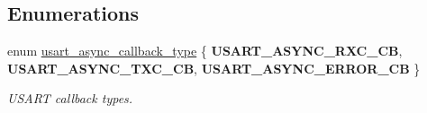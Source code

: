 \subsection*{Enumerations}
\begin{DoxyCompactItemize}
\item 
\mbox{\label{group__doc__driver__hal__usart__async_ga5a82ef383f62daa061a55838c8fc6d39}} 
enum \hyperlink{group__doc__driver__hal__usart__async_ga5a82ef383f62daa061a55838c8fc6d39}{usart\+\_\+async\+\_\+callback\+\_\+type} \{ {\bfseries U\+S\+A\+R\+T\+\_\+\+A\+S\+Y\+N\+C\+\_\+\+R\+X\+C\+\_\+\+CB}, 
{\bfseries U\+S\+A\+R\+T\+\_\+\+A\+S\+Y\+N\+C\+\_\+\+T\+X\+C\+\_\+\+CB}, 
{\bfseries U\+S\+A\+R\+T\+\_\+\+A\+S\+Y\+N\+C\+\_\+\+E\+R\+R\+O\+R\+\_\+\+CB}
 \}\begin{DoxyCompactList}\small\item\em U\+S\+A\+RT callback types. \end{DoxyCompactList}
\end{DoxyCompactItemize}
